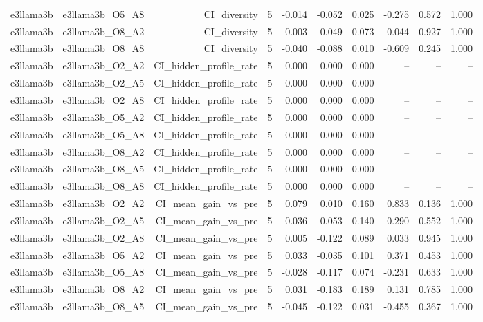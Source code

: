 \documentclass[11pt]{article}
\begin{document}
\begin{landscape}
\begin{longtable}{@{}lrrrrrrrrr@{}}
e3llama3b & e3llama3b\_O5\_A8 & CI\_diversity & 5 & -0.014 & -0.052 & 0.025 & -0.275 & 0.572 & 1.000 \\
e3llama3b & e3llama3b\_O8\_A2 & CI\_diversity & 5 & 0.003 & -0.049 & 0.073 & 0.044 & 0.927 & 1.000 \\
e3llama3b & e3llama3b\_O8\_A8 & CI\_diversity & 5 & -0.040 & -0.088 & 0.010 & -0.609 & 0.245 & 1.000 \\
e3llama3b & e3llama3b\_O2\_A2 & CI\_hidden\_profile\_rate & 5 & 0.000 & 0.000 & 0.000 & -- & -- & -- \\
e3llama3b & e3llama3b\_O2\_A5 & CI\_hidden\_profile\_rate & 5 & 0.000 & 0.000 & 0.000 & -- & -- & -- \\
e3llama3b & e3llama3b\_O2\_A8 & CI\_hidden\_profile\_rate & 5 & 0.000 & 0.000 & 0.000 & -- & -- & -- \\
e3llama3b & e3llama3b\_O5\_A2 & CI\_hidden\_profile\_rate & 5 & 0.000 & 0.000 & 0.000 & -- & -- & -- \\
e3llama3b & e3llama3b\_O5\_A8 & CI\_hidden\_profile\_rate & 5 & 0.000 & 0.000 & 0.000 & -- & -- & -- \\
e3llama3b & e3llama3b\_O8\_A2 & CI\_hidden\_profile\_rate & 5 & 0.000 & 0.000 & 0.000 & -- & -- & -- \\
e3llama3b & e3llama3b\_O8\_A5 & CI\_hidden\_profile\_rate & 5 & 0.000 & 0.000 & 0.000 & -- & -- & -- \\
e3llama3b & e3llama3b\_O8\_A8 & CI\_hidden\_profile\_rate & 5 & 0.000 & 0.000 & 0.000 & -- & -- & -- \\
e3llama3b & e3llama3b\_O2\_A2 & CI\_mean\_gain\_vs\_pre & 5 & 0.079 & 0.010 & 0.160 & 0.833 & 0.136 & 1.000 \\
e3llama3b & e3llama3b\_O2\_A5 & CI\_mean\_gain\_vs\_pre & 5 & 0.036 & -0.053 & 0.140 & 0.290 & 0.552 & 1.000 \\
e3llama3b & e3llama3b\_O2\_A8 & CI\_mean\_gain\_vs\_pre & 5 & 0.005 & -0.122 & 0.089 & 0.033 & 0.945 & 1.000 \\
e3llama3b & e3llama3b\_O5\_A2 & CI\_mean\_gain\_vs\_pre & 5 & 0.033 & -0.035 & 0.101 & 0.371 & 0.453 & 1.000 \\
e3llama3b & e3llama3b\_O5\_A8 & CI\_mean\_gain\_vs\_pre & 5 & -0.028 & -0.117 & 0.074 & -0.231 & 0.633 & 1.000 \\
e3llama3b & e3llama3b\_O8\_A2 & CI\_mean\_gain\_vs\_pre & 5 & 0.031 & -0.183 & 0.189 & 0.131 & 0.785 & 1.000 \\
e3llama3b & e3llama3b\_O8\_A5 & CI\_mean\_gain\_vs\_pre & 5 & -0.045 & -0.122 & 0.031 & -0.455 & 0.367 & 1.000 \\

\end{longtable}
\end{landscape}
\end{document}
